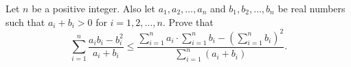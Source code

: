 \documentclass{article}
\begin{document}
\setlength{\parindent}{0pt}
Let $n$ be a positive integer. Also let $a_1,a_2,\ldots,a_n$ and $b_1,b_2,\ldots,b_n$ be real numbers such that $a_i+b_i>0$ for $i=1,2,\ldots,n$. Prove that$$\sum_{i=1}^n \frac{a_ib_i-b_i^2}{a_i+b_i}\leq \frac{\sum\limits_{i=1}^n a_i \cdot \sum\limits_{i=1}^n b_i -\left(\sum\limits_{i=1}^n b_i\right)^2}{\sum\limits_{i=1}^n (a_i+b_i)}.$$
\end{document}
